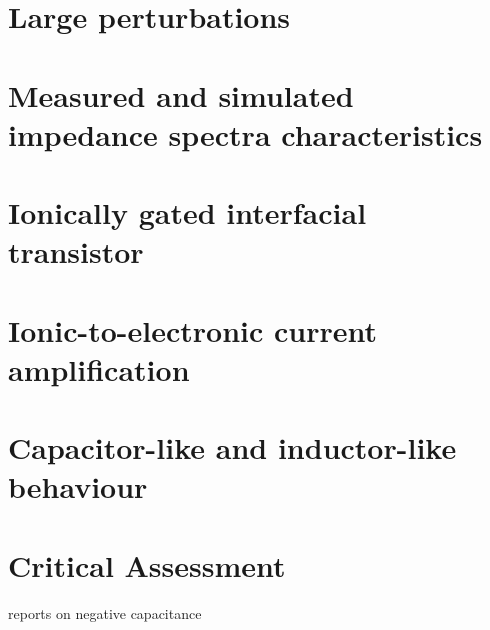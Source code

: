 
\section{Large perturbations}\label{impedance-large_perturbations}




\section{Measured and simulated impedance spectra characteristics}
\section{Ionically gated interfacial transistor}
\section{Ionic-to-electronic current amplification}
\section{Capacitor-like and inductor-like behaviour}
\section{Critical Assessment}

reports on negative capacitance \cite{Sanchez2014}